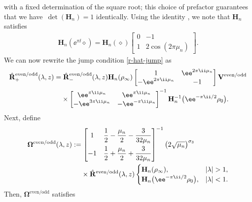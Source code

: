 with a fixed determination of the square root; this choice of prefactor guarantees that we have~$\det (\mathbf{H}_n ) = 1$ identically. Using the identity \cite[equation~(10.11.4)]{DLMF}, we note that $\mathbf{H}_n$ satisfies
\begin{gather}
\label{Bn-jump}
\mathbf{H}_n(\ee^{\pi \ii}\diamond) = \mathbf{H}_n(\diamond) \begin{bmatrix}
0 & -1 \\ 1 & 2\cos(2\pi \mu_n)
\end{bmatrix}.
\end{gather}
We can now rewrite the jump condition \eqref{r-hat-jump} as
\begin{align*}
 &\hat{\mathbf{R}}^\mathrm{even/odd}_+(\lambda,z)= \hat{\mathbf{R}}^\mathrm{even/odd}_-(\lambda,z) \mathbf{H}_n(\rho_\infty) \begin{bmatrix} 1 & \ee^{2\pi \ii \mu_n} \\ -\ee^{2\pi \ii \mu_n} & -1 \end{bmatrix} \mathbf{V}^\mathrm{even/odd}\\
 & \hphantom{\hat{\mathbf{R}}^\mathrm{even/odd}_+(\lambda,z)=}{}
 \times \begin{bmatrix} \ee^{\pi \ii \mu_n}& \ee^{\pi \ii \mu_n}\\ - \ee^{3\pi \ii \mu_n} & - \ee^{-\pi \ii \mu_n} \end{bmatrix}^{-1} \mathbf{H}_n^{-1}\big(\ee^{-\pi \ii/2}\rho_0\big).
\end{align*}
Next, define
\begin{align}
 & \mathbf{\Omega}^\mathrm{even/odd} (\lambda, z) := \begin{bmatrix} 1 & \dfrac{1}{2} - \dfrac{\mu_n}{2} - \dfrac{3}{32\mu_n} \vspace{1.5mm}\\ -1 & \dfrac{1}{2} + \dfrac{\mu_n}{2} + \dfrac{3}{32\mu_n} \end{bmatrix}^{-1} \big(2\sqrt{\mu_n}\big)^{\sigma_3}\nonumber\\
 &\hphantom{\mathbf{\Omega}^\mathrm{even/odd} (\lambda, z) :=}{}
 \times\hat{\mathbf{R}}^\mathrm{even/odd}(\lambda, z) \begin{cases}
 \mathbf{H}_n(\rho_\infty), & |\lambda| >1, \\
 \mathbf{H}_n\big(\ee^{-\pi \ii/2}\rho_0\big), & |\lambda| < 1.
 \end{cases}
 \label{eq:Omega-def}
\end{align}
Then, $\mathbf{\Omega}^\mathrm{even/odd}$ satisfies
